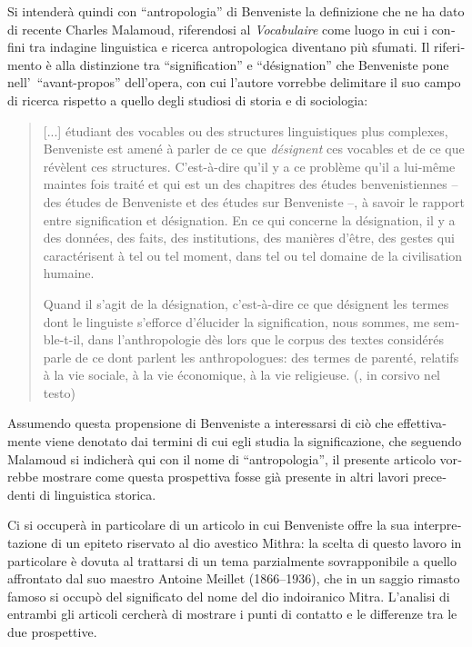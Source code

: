 \documentclass[french,output=paper,colorlinks,citecolor=brown]{../langscibook}
\begin{document}
\begin{otherlanguage}{italian}

Si intenderà quindi con “antropologia” di Benveniste la definizione che ne ha dato di recente Charles Malamoud, riferendosi al \textit{Vocabulaire} come luogo in cui i confini tra indagine linguistica e ricerca antropologica diventano più sfumati. Il riferimento è alla distinzione tra “signification” e “désignation” che Benveniste pone nell’~“avant-propos” dell’opera, con cui l’autore vorrebbe delimitare il suo campo di ricerca rispetto a quello degli studiosi di storia e di sociologia:

\begin{quote}
    [...] étudiant des vocables ou des structures linguistiques plus complexes, Benveniste est amené à parler de ce que \textit{désignent} ces vocables et de ce que révèlent ces structures. C’est-à-dire qu’il y a ce problème qu’il a lui-même maintes fois traité et qui est un des chapitres des études benvenistiennes – des études de Benveniste et des études sur Benveniste –, à savoir le rapport entre signification et désignation.  En ce qui concerne la désignation, il y a des données, des faits, des institutions, des manières d’être, des gestes qui caractérisent à tel ou tel moment, dans tel ou tel domaine de la civilisation humaine. 

    Quand il s’agit de la désignation, c’est-à-dire ce que désignent les termes dont le linguiste s’efforce d’élucider la signification, nous sommes, me semble-t-il, dans l’anthropologie dès lors que le corpus des textes considérés parle de ce dont parlent les anthropologues: des termes de parenté, relatifs à la vie sociale, à la vie économique, à la vie religieuse. (\citealt[246]{Malamoud2016}, in corsivo nel testo)
\end{quote}

Assumendo questa propensione di Benveniste a interessarsi di ciò che effettivamente viene denotato dai termini di cui egli studia la significazione, che seguendo Malamoud si indicherà qui con il nome di “antropologia”, il presente articolo vorrebbe mostrare come questa prospettiva fosse già presente in altri lavori precedenti di linguistica storica. 

Ci si occuperà in particolare di un articolo in cui Benveniste offre la sua interpretazione di un epiteto riservato al dio avestico Mithra: la scelta di questo lavoro in particolare è dovuta al trattarsi di un tema parzialmente sovrapponibile a quello affrontato dal suo maestro Antoine Meillet (1866--1936), che in un saggio rimasto famoso si occupò del significato del nome del dio indoiranico Mitra. L’analisi di entrambi gli articoli cercherà di mostrare i punti di contatto e le differenze tra le due prospettive.


\end{otherlanguage}
\end{document}
